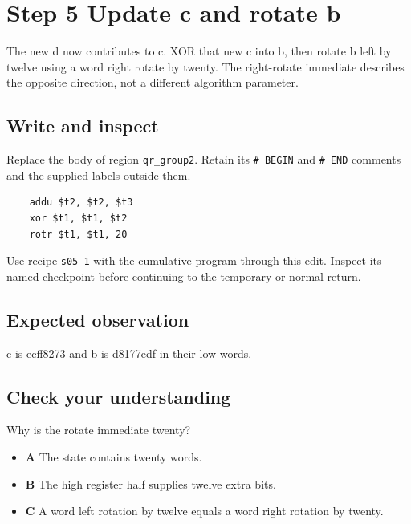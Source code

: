 \section{Step 5 Update c and rotate b}\label{chacha-s05}

The new d now contributes to c. XOR that new c into b, then rotate b left by twelve using a word right rotate by twenty. The right-rotate immediate describes the opposite direction, not a different algorithm parameter.

\subsection{Write and inspect}
Replace the body of region \texttt{qr\_group2}. Retain its \texttt{\# BEGIN} and \texttt{\# END} comments and the supplied labels outside them.

\begin{verbatim}
    addu $t2, $t2, $t3
    xor $t1, $t1, $t2
    rotr $t1, $t1, 20
\end{verbatim}

Use recipe \texttt{s05-1} with the cumulative program through this edit. Inspect its named checkpoint before continuing to the temporary or normal return.

\subsection{Expected observation}
c is ecff8273 and b is d8177edf in their low words.

\subsection{Check your understanding}
Why is the rotate immediate twenty?

\begin{itemize}
\item \textbf{A} The state contains twenty words.
\item \textbf{B} The high register half supplies twelve extra bits.
\item \textbf{C} A word left rotation by twelve equals a word right rotation by twenty.
\end{itemize}
